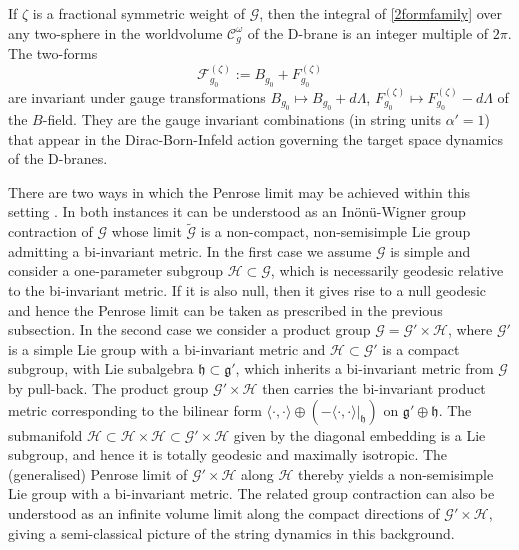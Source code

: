 If $\zeta$ is a fractional symmetric weight of $\mathcal{G}$, then the integral
of \eqref{2formfamily} over any two-sphere in the worldvolume
$\mathcal{C}_g^\omega$ of the D-brane is an integer multiple of $2\pi$. The
two-forms
\begin{equation}
  \label{inv2forms}
  \mathcal{F}_{g_0}^{(\zeta)}:=B_{g_0}+F_{g_0}^{(\zeta)}
\end{equation}
are invariant under gauge transformations $B_{g_0}\mapsto B_{g_0}+ d\Lambda$,
$F_{g_0}^{(\zeta)}\mapsto F_{g_0}^{(\zeta)}- d\Lambda$ of the
$B$-field. They are the gauge invariant combinations (in string units
$\alpha'=1$) that appear in the Dirac-Born-Infeld action governing the
target space dynamics of the D-branes.

There are two ways in which the Penrose limit may be achieved within this
setting \cite{BFP1}. In both instances it can be understood as an
In\"on\"u-Wigner group contraction of $\mathcal{G}$ whose limit
$\widetilde{\mathcal{G}}$ is a non-compact, non-semisimple Lie group admitting a
bi-invariant metric. In the first case we assume $\mathcal G$ is simple and
consider a one-parameter subgroup $\mathcal{H}\subset\mathcal{G}$, which is
necessarily geodesic relative to the bi-invariant metric. If it is also null,
then it gives rise to a null geodesic and hence the Penrose limit can be taken
as prescribed in the previous subsection. In the second case we consider a
product group $\mathcal{G}=\mathcal{G}'\times\mathcal{H}$, where $\mathcal{G}'$
is a simple Lie group with a bi-invariant metric and $\mathcal{H}\subset
\mathcal{G}'$ is a compact subgroup, with Lie subalgebra
$\mathfrak{h}\subset\mathfrak{g}'$, which inherits a bi-invariant metric from
$\mathcal{G}$ by pull-back. The product group $\mathcal{G}'\times \mathcal{H}$
then carries the bi-invariant product metric corresponding to the bilinear form
$\langle\cdot,\cdot\rangle\oplus (-\langle\cdot,\cdot\rangle|_{\mathfrak{h}})$
on $\mathfrak{g}'\oplus\mathfrak{h}$. The submanifold $\mathcal{H}\subset
\mathcal{H}\times\mathcal{H}\subset\mathcal{G}'\times \mathcal{H}$ given by the
diagonal embedding is a Lie subgroup, and hence it is totally geodesic and
maximally isotropic. The (generalised) Penrose limit of
$\mathcal{G}'\times\mathcal{H}$ along $\mathcal{H}$ thereby yields a
non-semisimple Lie group with a bi-invariant metric. The related group
contraction can also be understood as an infinite volume limit along the compact
directions of $\mathcal{G}'\times \mathcal{H}$, giving a semi-classical picture
of the string dynamics in this background.

